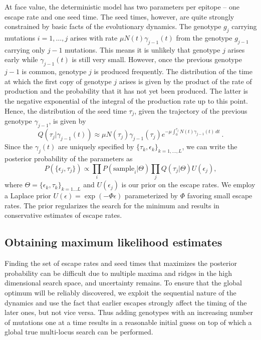 \documentclass{frontiers}
\newcommand{\gt}{g}
\newcommand{\gtfreq}{\gamma}
\newcommand{\fcoeff}{\epsilon}
\newcommand{\fitprior}{\Phi}
\begin{document}
At face value, the deterministic model has two parameters per epitope --
one escape rate and one seed time. The
seed times, however, are quite strongly constrained by basic facts of the
evolutionary dynamics. The genotype $\gt_j$ carrying mutations
$i=1,\ldots,j$ arises with
rate $\mu N(t)\gtfreq_{j-1}(t)$ from the genotype $\gt_{j-1}$ carrying only $j-1$ mutations.
This means it is unlikely that genotype $j$ arises early while $\gtfreq_{j-1}(t)$ is still
very small. However, once the previous genotype $j-1$ is common, genotype $j$ 
is produced frequently. The distribution of the time at which the first copy 
of genotype $j$ arises is given by the product of the rate of production and the 
probability that it has not yet been produced. The latter is the negative exponential 
of the integral of the production rate up to this point. Hence, the distribution of the 
seed time $\tau_j$, given the trajectory of the previous genotype $\gtfreq_{j-1}$,
is given by
\begin{equation}
\label{eq:seedtimes}
Q(\tau_j | \gtfreq_{j-1}(t)) \approx \mu N(\tau_j)\gtfreq_{j-1}(\tau_j) e^{-\mu
\int_0^{\tau_j} N(t)\gtfreq_{j-1}(t)\,dt} \ .
\end{equation}
Since the $\gtfreq_j(t)$ are uniquely specified by $\{\tau_k,\fcoeff_k\}_{k=1,\ldots,L}$, we can
write the posterior probability of the parameters as 
\begin{equation}
\label{eq:LH}
P(\{\fcoeff_j,\tau_j\})  \propto \prod_{i} P(\mathrm{sample}_i|\Theta)\prod_j
Q(\tau_j|\Theta)U(\fcoeff_j),
\end{equation}
where $\Theta = \{ \fcoeff_k,\tau_k\}_{k=1\ldots L}$ and $U(\fcoeff_j)$
is our prior on the escape rates. 
We employ a Laplace prior $U(\fcoeff) = \exp(-\fitprior\fcoeff)$  parameterized by $\fitprior$ 
favoring small escape rates. The prior regularizes the search for the minimum and results in
conservative estimates of escape rates.


\subsection{Obtaining maximum likelihood estimates} 
Finding the set of escape rates and seed times that maximizes the posterior probability
can be difficult due to multiple maxima and ridges in the high
dimensional search space, and uncertainty remains.
To ensure that the global optimum will be reliably discovered, we exploit the
sequential nature of the dynamics and use the fact that earlier escapes
strongly affect the timing of the later ones, but not vice versa. Thus adding
genotypes with an increasing number of mutations one at a time 
results in a reasonable initial guess on top of which a global true multi-locus search can be
performed.
\end{document}
